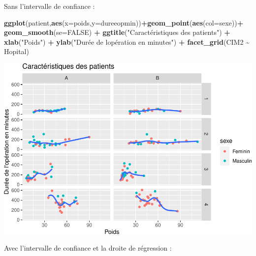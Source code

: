 \documentclass[
]{book}
\newenvironment{Shaded}{\begin{snugshade}}{\end{snugshade}}
\newcommand{\AttributeTok}[1]{\textcolor[rgb]{0.13,0.29,0.53}{#1}}
\newcommand{\ConstantTok}[1]{\textcolor[rgb]{0.56,0.35,0.01}{#1}}
\newcommand{\FunctionTok}[1]{\textcolor[rgb]{0.13,0.29,0.53}{\textbf{#1}}}
\newcommand{\NormalTok}[1]{#1}
\newcommand{\SpecialCharTok}[1]{\textcolor[rgb]{0.81,0.36,0.00}{\textbf{#1}}}
\newcommand{\StringTok}[1]{\textcolor[rgb]{0.31,0.60,0.02}{#1}}
\begin{document}
Sans l'intervalle de confiance :

\begin{Shaded}
\begin{Highlighting}[]
\FunctionTok{ggplot}\NormalTok{(patient,}\FunctionTok{aes}\NormalTok{(}\AttributeTok{x=}\NormalTok{poids,}\AttributeTok{y=}\NormalTok{dureeopmin))}\SpecialCharTok{+}\FunctionTok{geom\_point}\NormalTok{(}\FunctionTok{aes}\NormalTok{(}\AttributeTok{col=}\NormalTok{sexe))}\SpecialCharTok{+}
  \FunctionTok{geom\_smooth}\NormalTok{(}\AttributeTok{se=}\ConstantTok{FALSE}\NormalTok{) }\SpecialCharTok{+}
  \FunctionTok{ggtitle}\NormalTok{(}\StringTok{"Caractéristiques des patients"}\NormalTok{) }\SpecialCharTok{+} 
  \FunctionTok{xlab}\NormalTok{(}\StringTok{"Poids"}\NormalTok{) }\SpecialCharTok{+} 
  \FunctionTok{ylab}\NormalTok{(}\StringTok{"Durée de l\textquotesingle{}opération en minutes"}\NormalTok{) }\SpecialCharTok{+}
  \FunctionTok{facet\_grid}\NormalTok{(CIM2 }\SpecialCharTok{\textasciitilde{}}\NormalTok{ Hopital)}
\end{Highlighting}
\end{Shaded}

\includegraphics{_main_files/figure-latex/ggplot19-1.pdf}

Avec l'intervalle de confiance et la droite de régression :
\end{document}
